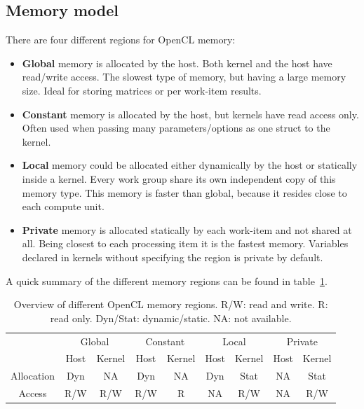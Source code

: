 \subsection{Memory model}
\label{sec:OpenCL:memmodel}
There are four different regions for OpenCL memory:
\begin{itemize}
\item \textbf{Global} memory is allocated by the host. Both kernel and the host have read/write access. The slowest type of memory, but having a large memory size. Ideal for storing matrices or per work-item results.
\item \textbf{Constant} memory is allocated by the host, but kernels have read access only. Often used when passing many parameters/options as one struct to the kernel.
\item \textbf{Local} memory could be allocated either dynamically by the host or statically inside a kernel. Every work group share its own independent copy of this memory type. This memory is faster than global, because it resides close to each compute unit. 
\item \textbf{Private} memory is allocated statically by each work-item and not shared at all. Being closest to each processing item it is the fastest memory. Variables declared in kernels without specifying the region is private by default.
\end{itemize}
A quick summary of the different memory regions can be found in table~\ref{tab:OpenCL:memory}.

\begin{table}
\begin{center}
\begin{tabular}{c|cc|cc|cc|cc}
& \multicolumn{2}{c|}{Global} & \multicolumn{2}{c|}{Constant} & \multicolumn{2}{c|}{Local} & \multicolumn{2}{c}{Private}\\
& Host & Kernel& Host & Kernel& Host & Kernel& Host & Kernel \\
\hline
Allocation & Dyn & NA & Dyn & NA & Dyn & Stat & NA & Stat\\ 
Access & R/W & R/W & R/W & R & NA & R/W & NA & R/W\\ 
\hline 
\end{tabular} 
\caption{Overview of different OpenCL memory regions. R/W: read and write. R: read only. Dyn/Stat: dynamic/static. NA: not available.}
\label{tab:OpenCL:memory}
\end{center}
\end{table}



